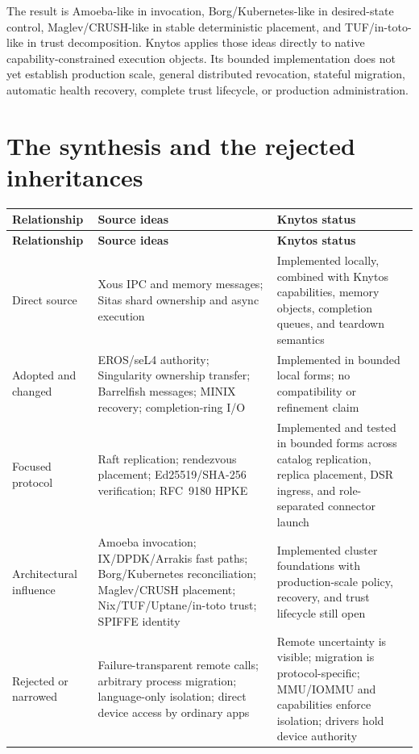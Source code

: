 The result is Amoeba-like in invocation, Borg/Kubernetes-like in desired-state
control, Maglev/CRUSH-like in stable deterministic placement, and
TUF/in-toto-like in trust decomposition. Knytos applies those ideas
directly to native capability-constrained execution objects. Its bounded
implementation does not yet establish production scale, general distributed
revocation, stateful migration, automatic health recovery, complete trust
lifecycle, or production administration.

\section{The synthesis and the rejected inheritances}

\begin{longtable}{|p{}|p{}|p{}|}
\hline
\textbf{Relationship} & \textbf{Source ideas} & \textbf{Knytos status} \\
\hline
\endfirsthead
\hline
\textbf{Relationship} & \textbf{Source ideas} & \textbf{Knytos status} \\
\hline
\endhead
Direct source & Xous IPC and memory messages; Sitas shard ownership and async
execution & Implemented locally, combined with Knytos capabilities,
memory objects, completion queues, and teardown semantics \\
\hline
Adopted and changed & EROS/seL4 authority; Singularity ownership transfer;
Barrelfish messages; MINIX recovery; completion-ring I/O & Implemented in
bounded local forms; no compatibility or refinement claim \\
\hline
Focused protocol & Raft replication; rendezvous placement;
Ed25519/SHA-256 verification; RFC~9180 HPKE & Implemented and tested in bounded
forms across catalog replication, replica placement, DSR ingress, and
role-separated connector launch \\
\hline
Architectural influence & Amoeba invocation; IX/DPDK/Arrakis fast paths;
Borg/Kubernetes reconciliation; Maglev/CRUSH placement;
Nix/TUF/Uptane/in-toto trust; SPIFFE identity & Implemented cluster foundations
with production-scale policy, recovery, and trust lifecycle still open \\
\hline
Rejected or narrowed & Failure-transparent remote calls; arbitrary process
migration; language-only isolation; direct device access by ordinary apps &
Remote uncertainty is visible; migration is protocol-specific; MMU/IOMMU and
capabilities enforce isolation; drivers hold device authority \\
\hline
\end{longtable}

\endinput
